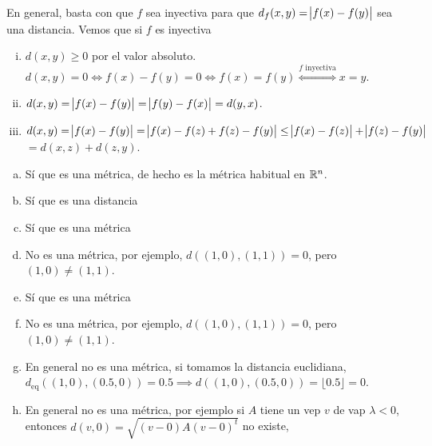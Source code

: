 \begin{eje}
    En general, basta con que $f$ sea inyectiva para que $d_f(x,y) = \abs{f(x) - f(y)}$ sea una distancia. Vemos que si $f$ es inyectiva
    \begin{enumerate}[i)]
        \item $d(x,y) \geq 0$ por el valor absoluto. $d(x, y) = 0 \iff f(x) - f(y) = 0 \iff f(x) = f(y) \stackrel{f \text{ inyectiva}}{\iff} x = y$.
        \item $d(x,y) = \abs{f(x) - f(y)} = \abs{f(y) - f(x)} = d(y,x)$.
        \item $d(x,y) = \abs{f(x) - f(y)} = \abs{f(x) - f(z) + f(z) - f(y)} \leq \abs{f(x) - f(z)} + \abs{f(z) - f(y)}$ $ = d(x, z) + d(z, y)$.
    \end{enumerate}
\end{eje}

\begin{eje}
    \begin{enumerate}[(a)]
        \item Sí que es una m\'etrica, de hecho es la m\'etrica habitual en $\mathbb{R}^n$.
            \begin{center}
                
            \end{center}
        \item Sí que es una distancia
            \begin{center}
                
            \end{center}
        \item Sí que es una m\'etrica
            \begin{center}
                
            \end{center}
        \item No es una m\'etrica, por ejemplo, $d\left( (1,0), (1,1) \right) = 0$, pero $(1,0) \neq (1,1)$.
        \item Sí que es una m\'etrica
            \begin{center}
                
            \end{center}
        \item No es una m\'etrica, por ejemplo, $d\left( (1,0), (1,1) \right) = 0$, pero $(1,0) \neq (1,1)$.
        \item En general no  es una m\'etrica, si tomamos la distancia euclidiana, $d_{\text{eq}} \left( (1, 0) , (0.5, 0) \right) = 0.5 \implies
            d\left( (1,0), (0.5, 0) \right) = \lfloor0.5 \rfloor = 0$.
        \item En general no es una m\'etrica, por ejemplo si $A$ tiene un vep $v$ de vap $\lambda < 0$, entonces $d(v, 0) = \sqrt{(v - 0) A (v-0)^t}$ no existe,

\end{enumerate}
\end{eje}
